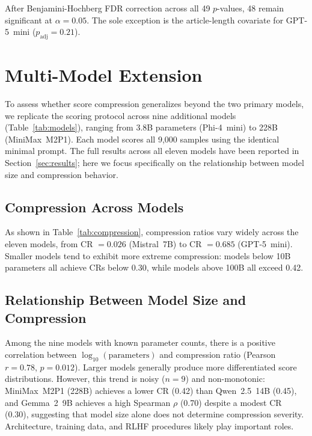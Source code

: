 \documentclass[11pt]{article}
\begin{document}
After Benjamini-Hochberg FDR correction across all 49 $p$-values, 48 remain significant at $\alpha = 0.05$. The sole exception is the article-length covariate for GPT-5~mini ($p_{\text{adj}} = 0.21$).

\section{Multi-Model Extension}
\label{sec:multimodel}

To assess whether score compression generalizes beyond the two primary models, we replicate the scoring protocol across nine additional models (Table~\ref{tab:models}), ranging from 3.8B parameters (Phi-4~mini) to 228B (MiniMax~M2P1). Each model scores all 9{,}000 samples using the identical minimal prompt. The full results across all eleven models have been reported in Section~\ref{sec:results}; here we focus specifically on the relationship between model size and compression behavior.

\subsection{Compression Across Models}

As shown in Table~\ref{tab:compression}, compression ratios vary widely across the eleven models, from CR $= 0.026$ (Mistral~7B) to CR $= 0.685$ (GPT-5~mini). Smaller models tend to exhibit more extreme compression: models below 10B parameters all achieve CRs below 0.30, while models above 100B all exceed 0.42.

\subsection{Relationship Between Model Size and Compression}

Among the nine models with known parameter counts, there is a positive correlation between $\log_{10}(\text{parameters})$ and compression ratio (Pearson $r = 0.78$, $p = 0.012$). Larger models generally produce more differentiated score distributions. However, this trend is noisy ($n = 9$) and non-monotonic: MiniMax~M2P1 (228B) achieves a lower CR (0.42) than Qwen~2.5~14B (0.45), and Gemma~2~9B achieves a high Spearman $\rho$ (0.70) despite a modest CR (0.30), suggesting that model size alone does not determine compression severity. Architecture, training data, and RLHF procedures likely play important roles.
\end{document}
